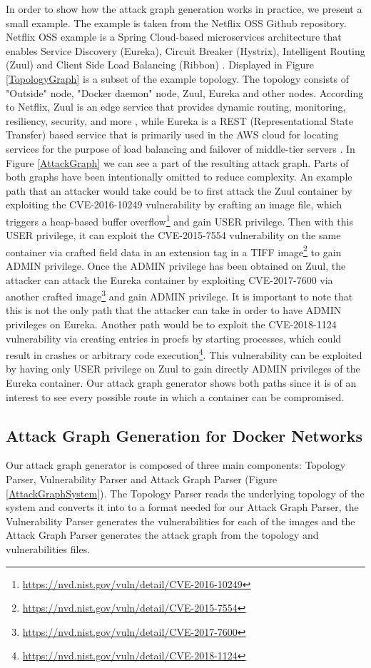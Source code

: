 In order to show how the attack graph generation works in practice, we present a small example. The example is taken from the Netflix OSS Github repository. Netflix OSS example is a Spring Cloud-based microservices architecture that enables Service Discovery (Eureka), Circuit Breaker (Hystrix), Intelligent Routing (Zuul) and Client Side Load Balancing (Ribbon) \cite{netflixoss, springcloudnetflix}. Displayed in Figure \ref{TopologyGraph} is a subset of the example topology. The topology consists of "Outside" node, "Docker daemon" node, Zuul, Eureka and other nodes. According to Netflix, Zuul is an edge service that provides dynamic routing, monitoring, resiliency, security, and more \cite{netflixzuul}, while Eureka is a REST (Representational State Transfer) based service that is primarily used in the AWS cloud for locating services for the purpose of load balancing and failover of middle-tier servers \cite{netflixeureka}. In Figure \ref{AttackGraph} we can see a part of the resulting attack graph. Parts of both graphs have been intentionally omitted to reduce complexity. An example path that an attacker would take could be to first attack the Zuul container by exploiting the CVE-2016-10249 vulnerability by crafting an image file, which triggers a heap-based buffer overflow\footnote{\url{https://nvd.nist.gov/vuln/detail/CVE-2016-10249}} and gain USER privilege.  Then with this USER privilege, it can exploit the CVE-2015-7554 vulnerability on the same container via crafted field data in an extension tag in a TIFF image\footnote{\url{https://nvd.nist.gov/vuln/detail/CVE-2015-7554}} to gain ADMIN privilege. Once the ADMIN privilege has been obtained on Zuul, the attacker can attack the Eureka container by exploiting CVE-2017-7600 via another crafted image\footnote{\url{https://nvd.nist.gov/vuln/detail/CVE-2017-7600}} and gain ADMIN privilege. It is important to note that this is not the only path that the attacker can take in order to have ADMIN privileges on Eureka. Another path would be to exploit the CVE-2018-1124 vulnerability via creating entries in procfs by starting processes, which could result in crashes or arbitrary code execution\footnote{\url{https://nvd.nist.gov/vuln/detail/CVE-2018-1124}}. This vulnerability can be exploited by having only USER privilege on Zuul to gain directly ADMIN privileges of the Eureka container. Our attack graph generator shows both paths since it is of an interest to see every possible route in which a container can be compromised.



\subsection{Attack Graph Generation for Docker Networks}
\label{chap:technical}
Our attack graph generator is composed of three main components: Topology Parser, Vulnerability Parser and Attack Graph Parser (Figure \ref{AttackGraphSystem}). The Topology Parser reads the underlying topology of the system and converts it into to a format needed for our Attack Graph Parser, the Vulnerability Parser generates the vulnerabilities for each of the images and the Attack Graph Parser generates the attack graph from the topology and vulnerabilities files. 

